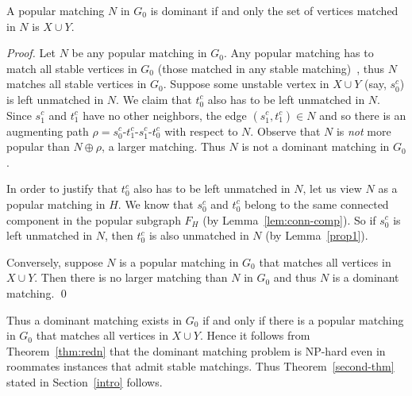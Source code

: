 \documentclass{llncs}
\begin{document}
  \begin{lemma}
     A popular matching $N$ in $G_0$ is dominant if and only the set of vertices matched in $N$ is $X \cup Y$.
  \end{lemma}
  \begin{proof}
    Let $N$ be any popular matching in $G_0$. Any popular matching has to match all stable vertices in $G_0$ (those matched in any stable matching)~\cite{HK11},
    thus $N$ matches all stable vertices in $G_0$. Suppose some unstable vertex in $X \cup Y$ (say, $s^c_0$) is left unmatched in $N$. 
    We claim that $t^c_0$ also has to be left unmatched in $N$. Since $s^c_1$ and $t^c_1$ have no other neighbors, the edge $(s^c_1,t^c_1) \in N$
    and so there is an augmenting path
    $\rho = s^c_0$-$t^c_1$-$s^c_1$-$t^c_0$ with respect to $N$. Observe that $N$ is {\em not} more popular than $N \oplus \rho$, a larger matching.
    Thus $N$ is not a dominant matching in $G_0$.
    
    In order to justify that $t^c_0$ also has to be left unmatched in $N$,
    let us view $N$ as a popular matching in $H$.
    We know that  $s^c_0$ and $t^c_0$ belong to the same connected component in the popular
    subgraph $F_H$ (by Lemma~\ref{lem:conn-comp}). So if $s^c_0$ is left unmatched in $N$, then $t^c_0$ is also unmatched in $N$ (by Lemma~\ref{prop1}). 
  

    Conversely, suppose $N$ is a popular matching in $G_0$ that matches all  vertices in $X \cup Y$. Then there is no larger matching than $N$ in $G_0$
    and thus $N$ is a dominant matching. \qed
  \end{proof}
  
  Thus a dominant matching exists in $G_0$ if and only if there is a popular matching in $G_0$ that matches all vertices in $X \cup Y$.
  Hence it follows from Theorem~\ref{thm:redn} that the dominant matching problem
  is NP-hard even in roommates instances that admit stable matchings. Thus Theorem~\ref{second-thm} stated in Section~\ref{intro} follows.
\end{document}
